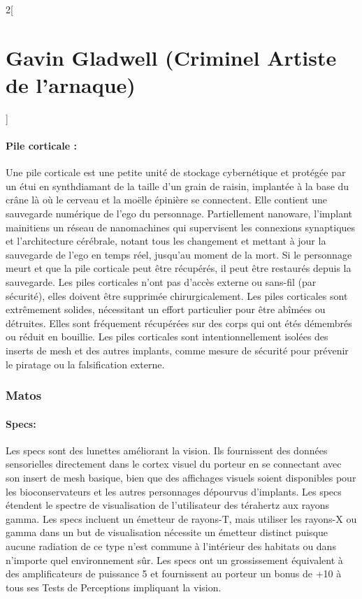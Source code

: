 \documentclass[a4paper,9pt]{article}
\begin{document}
\begin{multicols}{2}[\section*{Gavin Gladwell (Criminel Artiste de l'arnaque)}]
\paragraph{Pile corticale :}
Une pile corticale est une petite unité de stockage cybernétique et protégée
par un étui en synthdiamant de la taille d'un grain de raisin, implantée à la
base du crâne là où le cerveau et la moëlle épinière se connectent. Elle
contient une sauvegarde numérique de l'ego du personnage. Partiellement
nanoware, l'implant mainitiens un réseau de nanomachines qui supervisent
les connexions synaptiques et l'architecture cérébrale, notant tous les
changement et mettant à jour la sauvegarde de l'ego en temps réel, jusqu'au
moment de la mort. Si le personnage meurt et que la pile corticale peut être
récupérés, il peut être restaurés depuis la sauvegarde. Les piles corticales
n'ont pas d'accès externe ou sans-fil (par sécurité), elles doivent être
supprimée chirurgicalement. Les piles corticales sont extrêmement solides,
nécessitant un effort particulier pour être abîmées ou détruites. Elles sont
fréquement récupérées sur des corps qui ont étés démembrés ou réduit en
bouillie. Les piles corticales sont intentionnellement isolées des inserts de
mesh et des autres implants, comme mesure de sécurité pour prévenir le piratage
ou la falsification externe.

\subsubsection*{Matos}

\paragraph{Specs:} Les specs sont des lunettes améliorant la vision. Ils
fournissent des données sensorielles directement dans le cortex visuel
du porteur en se connectant avec son insert de mesh basique, bien que
des affichages visuels soient disponibles pour les bioconservateurs et les
autres personnages dépourvus d'implants. Les specs étendent le spectre de
visualisation de l'utilisateur des térahertz aux rayons gamma. Les
specs incluent un émetteur de rayons-T, mais utiliser les rayons-X ou
gamma dans un but de visualisation nécessite un émetteur distinct puisque
aucune radiation de ce type n'est commune à l'intérieur des habitats ou dans
n'importe quel environnement sûr. Les specs ont un grossissement équivalent à
des amplificateurs de puissance 5 et fournissent au porteur un bonus de +10 à
tous ses Tests de Perceptions impliquant la vision.

\end{multicols}
\end{document}
